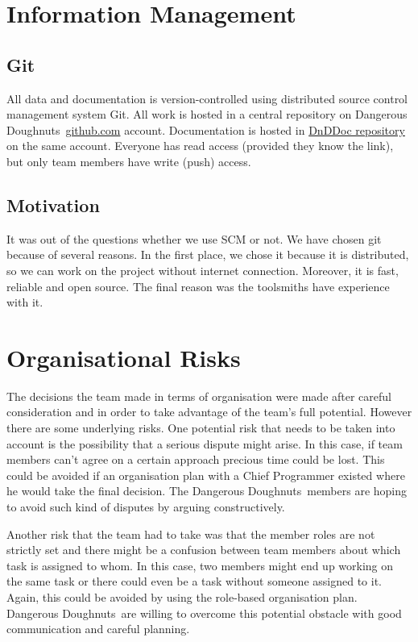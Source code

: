 \documentclass{article}
\newcommand{\dnd}{Dangerous Doughnuts}
\begin{document}
\section{Information Management}
\label{info}

\subsection{Git}
All data and documentation is version-controlled using distributed source control management system Git.
All work is hosted in a central repository on \dnd\ \href{https://github.com/DangerousDoughnuts/}{github.com} account.
Documentation is hosted in \href{https://github.com/DangerousDoughnuts/DnDDoc}{DnDDoc repository} on the same account.
Everyone has read access (provided they know the link), but only team members have write (push) access.

\subsection{Motivation}
It was out of the questions whether we use SCM or not. We have chosen git because of several reasons.
In the first place, we chose it because it is distributed, so we can work on the project without internet connection.
Moreover, it is fast, reliable and open source. The final reason was the toolsmiths have experience with it.



\section{Organisational Risks}
\label{lastSection}

The decisions the team made in terms of organisation were made after careful consideration and in order to take advantage of the team's full potential. However there are some underlying risks. One potential risk that needs to be taken into account is the possibility that a serious dispute might arise. In this case, if team members can't agree on a certain approach precious time could be lost. This could be avoided if an organisation plan with a Chief Programmer existed where he would take the final decision. The \dnd\ members are hoping to avoid such kind of disputes by arguing constructively.

Another risk that the team had to take was that the member roles are not strictly set and there might be a confusion between team members about which task is assigned to whom. In this case, two members might end up working on the same task or there could even be a task without someone assigned to it. Again, this could be avoided by using the role-based organisation plan. \dnd\ are willing to overcome this potential obstacle with good communication and careful planning.




\end{document}
